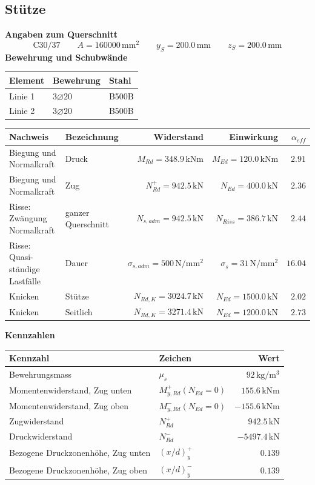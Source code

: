\documentclass[11pt,a4paper]{article}
\begin{document}
\subsection{Stütze}
\noindent\textbf{Angaben zum Querschnitt}
\begin{equation*}
\text{C30/37} \qquad A = 160000\,\mathrm{mm}^2 \qquad y_S = 200.0\,\mathrm{mm} \qquad z_S = 200.0\,\mathrm{mm}
\end{equation*}
\noindent\textbf{Bewehrung und Schubwände}
\begin{longtable}{lll}
\hline
Element & Bewehrung & Stahl \\
\hline
\endhead
Linie 1 & $3 \varnothing 20$ & B500B \\
Linie 2 & $3 \varnothing 20$ & B500B \\
\hline
\end{longtable}
\begin{xltabular}{\linewidth}{>{\raggedright\arraybackslash}X>{\raggedright\arraybackslash}Xrrr}
\hline
Nachweis & Bezeichnung & Widerstand & Einwirkung & $\alpha_{eff}$ \\
\hline
\endhead
Biegung und Normalkraft & Druck & $M_{Rd} = 348.9\,\mathrm{kNm}$ & $M_{Ed} = 120.0\,\mathrm{kNm}$ & $2.91$ \\
Biegung und Normalkraft & Zug & $N_{Rd}^{+} = 942.5\,\mathrm{kN}$ & $N_{Ed} = 400.0\,\mathrm{kN}$ & $2.36$ \\
Risse: Zwängung Normalkraft & ganzer Querschnitt & $N_{s,adm} = 942.5\,\mathrm{kN}$ & $N_{Riss} = 386.7\,\mathrm{kN}$ & $2.44$ \\
Risse: Quasi-ständige Lastfälle & Dauer & $\sigma_{s,adm} = 500\,\mathrm{N}/\mathrm{mm}^{2}$ & $\sigma_s = 31\,\mathrm{N}/\mathrm{mm}^{2}$ & $16.04$ \\
Knicken & Stütze & $N_{Rd,K} = 3024.7\,\mathrm{kN}$ & $N_{Ed} = 1500.0\,\mathrm{kN}$ & $2.02$ \\
Knicken & Seitlich & $N_{Rd,K} = 3271.4\,\mathrm{kN}$ & $N_{Ed} = 1200.0\,\mathrm{kN}$ & $2.73$ \\
\hline
\end{xltabular}
\noindent\textbf{Kennzahlen}
\begin{longtable}{llr}
\hline
Kennzahl & Zeichen & Wert \\
\hline
\endhead
Bewehrungsmass & $\mu_s$ & $92\,\mathrm{kg}/\mathrm{m}^{3}$ \\
Momentenwiderstand, Zug unten & $M_{y,Rd}^{+}(N_{Ed} = 0)$ & $155.6\,\mathrm{kNm}$ \\
Momentenwiderstand, Zug oben & $M_{y,Rd}^{-}(N_{Ed} = 0)$ & $-155.6\,\mathrm{kNm}$ \\
Zugwiderstand & $N_{Rd}^{+}$ & $942.5\,\mathrm{kN}$ \\
Druckwiderstand & $N_{Rd}^{-}$ & $-5497.4\,\mathrm{kN}$ \\
Bezogene Druckzonenhöhe, Zug unten & $\left(x/d\right)_{y}^{+}$ & $0.139$ \\
Bezogene Druckzonenhöhe, Zug oben & $\left(x/d\right)_{y}^{-}$ & $0.139$ \\
\hline
\end{longtable}
\end{document}
